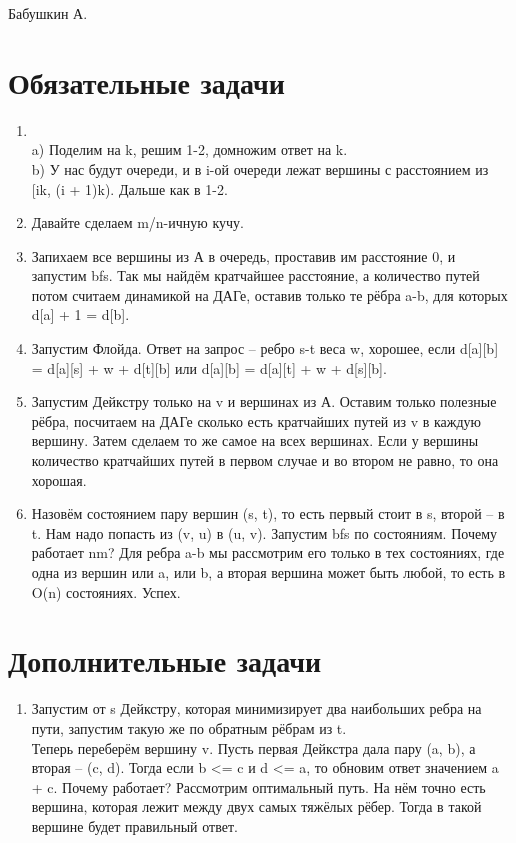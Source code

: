 \documentclass[12pt]{article}
\begin{document}
\def\t{\texttt}

Бабушкин А.

\section{Обязательные задачи}

\begin{enumerate}
	\setlength{\parskip}{0pt} 
	\setlength{\itemsep}{0pt} 
	\item ~\\
    a) Поделим на k, решим 1-2, домножим ответ на k. \\
    b) У нас будут очереди, и в i-ой очереди лежат вершины с расстоянием из [ik, (i + 1)k). Дальше как в 1-2. \\
    \item Давайте сделаем m/n-ичную кучу. \\
    \item Запихаем все вершины из А в очередь, проставив им расстояние 0, и запустим bfs. Так мы найдём кратчайшее расстояние, а количество 
    путей потом считаем динамикой на ДАГе, оставив только те рёбра a-b, для которых d[a] + 1 = d[b]. \\
    \item Запустим Флойда. Ответ на запрос -- ребро s-t веса w, хорошее, если d[a][b] = d[a][s] + w + d[t][b] или d[a][b] = d[a][t] + w + 
    d[s][b]. \\
    \item Запустим Дейкстру только на v и вершинах из А. Оставим только полезные рёбра, посчитаем на ДАГе сколько есть кратчайших путей из v 
    в каждую вершину. Затем сделаем то же самое на всех вершинах. Если у вершины количество кратчайших путей в первом случае и во втором не равно, 
    то она хорошая. \\
    \item Назовём состоянием пару вершин (s, t), то есть первый стоит в s, второй -- в t. Нам надо попасть из (v, u) в (u, v). 
    Запустим bfs по состояниям. Почему работает nm? Для ребра a-b мы рассмотрим его только в тех состояниях, где одна из вершин или a, или b, 
    а вторая вершина может быть любой, то есть в O(n) состояниях. Успех. \\
\end{enumerate}

\section{Дополнительные задачи}

\begin{enumerate}
	\setlength{\parskip}{0pt} 
	\setlength{\itemsep}{0pt} 
	\item Запустим от s Дейкстру, которая минимизирует два наибольших ребра на пути, запустим такую же по обратным рёбрам из t. \\
    Теперь переберём вершину v. Пусть первая Дейкстра дала пару (a, b), а вторая -- (c, d). Тогда если b <= c и d <= a, то обновим ответ 
    значением a + c. Почему работает? Рассмотрим оптимальный путь. На нём точно есть вершина, которая лежит между двух самых тяжёлых рёбер. 
    Тогда в такой вершине будет правильный ответ. \\
\end{enumerate}
\end{document}
